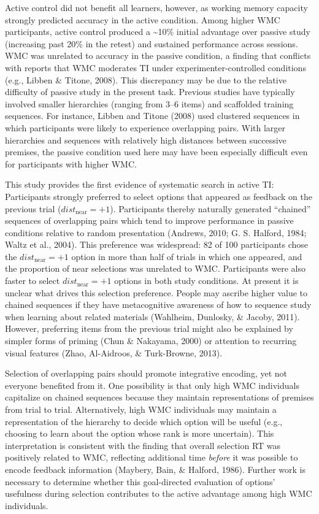 \documentclass[floatsintext,man]{apa6}
\theoremstyle{definition}
\theoremstyle{definition}
\theoremstyle{definition}
\theoremstyle{remark}
\begin{document}
Active control did not benefit all learners, however, as working memory
capacity strongly predicted accuracy in the active condition. Among
higher WMC participants, active control produced a \textasciitilde{}10\%
initial advantage over passive study (increasing past 20\% in the
retest) and sustained performance across sessions. WMC was unrelated to
accuracy in the passive condition, a finding that conflicts with reports
that WMC moderates TI under experimenter-controlled conditions (e.g.,
Libben \& Titone, 2008). This discrepancy may be due to the relative
difficulty of passive study in the present task. Previous studies have
typically involved smaller hierarchies (ranging from 3--6 items) and
scaffolded training sequences. For instance, Libben and Titone (2008)
used clustered sequences in which participants were likely to experience
overlapping pairs. With larger hierarchies and sequences with relatively
high distances between successive premises, the passive condition used
here may have been especially difficult even for participants with
higher WMC.

This study provides the first evidence of systematic search in active
TI: Participants strongly preferred to select options that appeared as
feedback on the previous trial (\(dist_{\text{near}}=+1\)). Participants
thereby naturally generated \enquote{chained} sequences of overlapping
pairs which tend to improve performance in passive conditions relative
to random presentation (Andrews, 2010; G. S. Halford, 1984; Waltz et
al., 2004). This preference was widespread: 82 of 100 participants chose
the \(dist_{\text{near}}=+1\) option in more than half of trials in
which one appeared, and the proportion of near selections was unrelated
to WMC. Participants were also faster to select
\(dist_{\text{near}}=+1\) options in both study conditions. At present
it is unclear what drives this selection preference. People may ascribe
higher value to chained sequences if they have metacognitive awareness
of how to sequence study when learning about related materials
(Wahlheim, Dunlosky, \& Jacoby, 2011). However, preferring items from
the previous trial might also be explained by simpler forms of priming
(Chun \& Nakayama, 2000) or attention to recurring visual features
(Zhao, Al-Aidroos, \& Turk-Browne, 2013).

Selection of overlapping pairs should promote integrative encoding, yet
not everyone benefited from it. One possibility is that only high WMC
individuals capitalize on chained sequences because they maintain
representations of premises from trial to trial. Alternatively, high WMC
individuals may maintain a representation of the hierarchy to decide
which option will be useful (e.g., choosing to learn about the option
whose rank is more uncertain). This interpretation is consistent with
the finding that overall selection RT was positively related to WMC,
reflecting additional time \emph{before} it was possible to encode
feedback information (Maybery, Bain, \& Halford, 1986). Further work is
necessary to determine whether this goal-directed evaluation of options'
usefulness during selection contributes to the active advantage among
high WMC individuals.
\end{document}

